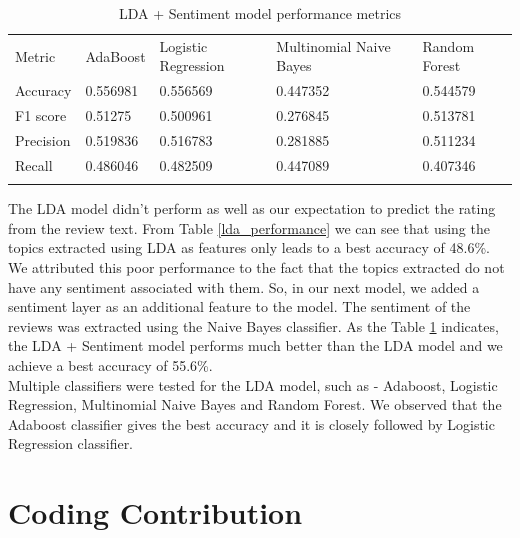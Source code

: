 \documentclass[paper=a4, fontsize=11pt]{scrartcl} %
\numberwithin{equation}{section} %
\numberwithin{figure}{section} %
\numberwithin{table}{section} %
\begin{document}
\begin{table}[!htb]
 \centering
 \caption{LDA + Sentiment model performance metrics}
 \label{lda_sentiment_performance}
 \begin{tabular}{l l l l l} 
    \noalign{\smallskip}\hline\noalign{\smallskip}
    Metric & AdaBoost & Logistic Regression & \multicolumn{1}{p{3cm}}{Multinomial Naive Bayes}& Random Forest\\
    \noalign{\smallskip}\hline\noalign{\smallskip}
    Accuracy & 0.556981	&0.556569	&0.447352	&0.544579\\
    F1 score & 0.51275 &0.500961	&0.276845	&0.513781\\
    Precision & 0.519836 &0.516783	&0.281885 &0.511234\\
    Recall & 0.486046	&0.482509	&0.447089	&0.407346\\
    \noalign{\smallskip}\hline
  \end{tabular} 
\end{table}  

The LDA model didn't perform as well as our expectation to predict the rating from the review text. From Table \ref{lda_performance} we can see that using the topics extracted using LDA as features only leads to a best accuracy of 48.6\%. We attributed this poor performance to the fact that the topics extracted do not have any sentiment associated with them. So, in our next model, we added a sentiment layer as an additional feature to the model. The sentiment of the reviews was extracted using the Naive Bayes classifier. As the Table \ref{lda_sentiment_performance} indicates, the LDA + Sentiment model performs much better than the LDA model and we achieve a best accuracy of 55.6\%.
\\

Multiple classifiers were tested for the LDA model, such as - Adaboost, Logistic Regression, Multinomial Naive Bayes and Random Forest. We observed that the Adaboost classifier gives the best accuracy and it is closely followed by Logistic Regression classifier.\newpage

\section{Coding Contribution}
\end{document}
